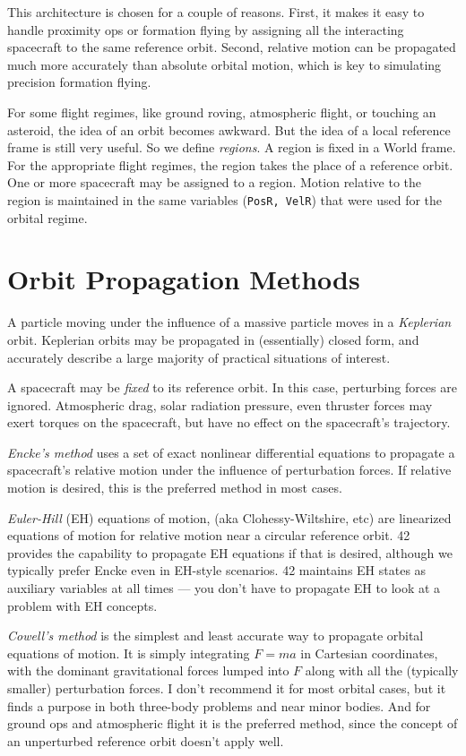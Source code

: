 \documentclass[12pt]{article}
\begin{document}
This architecture is chosen for a couple of reasons.  First, it makes it easy to handle proximity ops or formation flying by assigning all the interacting spacecraft to the same reference orbit.  Second, relative motion can be propagated much more accurately than absolute orbital motion, which is key to simulating precision formation flying.  

For some flight regimes, like ground roving, atmospheric flight, or touching an asteroid, the idea of an orbit becomes awkward.  But the idea of a local reference frame is still very useful.  So we define {\em regions}.  A region is fixed in a World frame.  For the appropriate flight regimes, the region takes the place of a reference orbit.  One or more spacecraft may be assigned to a region.  Motion relative to the region is maintained in the same variables ({\tt PosR, VelR}) that were used for the orbital regime.

\section {Orbit Propagation Methods}

A particle moving under the influence of a massive particle moves in a {\em Keplerian} orbit.  Keplerian orbits may be propagated in (essentially) closed form, and accurately describe a large majority of practical situations of interest.

A spacecraft may be {\em fixed} to its reference orbit.  In this case, perturbing forces are ignored.  Atmospheric drag, solar radiation pressure, even thruster forces may exert torques on the spacecraft, but have no effect on the spacecraft's trajectory.

{\em Encke's method} uses a set of exact nonlinear differential equations to propagate a spacecraft's relative motion under the influence of perturbation forces.  If relative motion is desired, this is the preferred method in most cases.

{\em Euler-Hill} (EH) equations of motion, (aka Clohessy-Wiltshire, etc) are linearized equations of motion for relative motion near a circular reference orbit.  42 provides the capability to propagate EH equations if that is desired, although we typically prefer Encke even in EH-style scenarios.  42 maintains EH states as auxiliary variables at all times --- you don't have to propagate EH to look at a problem with EH concepts. 

{\em Cowell's method} is the simplest and least accurate way to propagate orbital equations of motion.  It is simply integrating $F=ma$ in Cartesian coordinates, with the dominant gravitational forces lumped into $F$ along with all the (typically smaller) perturbation forces.  I don't recommend it for most orbital cases, but it finds a purpose in both three-body problems and near minor bodies.  And for ground ops and atmospheric flight it is the preferred method, since the concept of an unperturbed reference orbit doesn't apply well.
\end{document}
